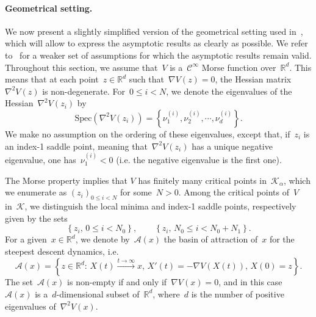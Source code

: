 \documentclass[a4]{article}
\newcommand{\R}{\mathbb{R}}
\newcommand{\1}{\mathbbm 1}
\newcommand{\basin}[1]{\mathcal A(#1)}
\newcommand{\hessEigval}[2]{\nu^{(#1)}_{#2}} %
\begin{document}
    \paragraph{Geometrical setting.}
        We now present a slightly simplified version of the geometrical setting used in~\cite{BLS24}, which will allow to express the asymptotic results as clearly as possible. We refer to~\cite{BLS24} for a weaker set of assumptions for which the asymptotic results remain valid.
        Throughout this section, we assume that~$V$ is a~$\mathcal C^\infty$ Morse function over~$\R^d$. This means that at each point~$z\in \R^d$ such that~$\nabla V(z)=0$, the Hessian matrix~$\nabla^2 V(z)$ is non-degenerate.
        For~$0\leq i < N$, we denote the eigenvalues of the Hessian~$\nabla^2 V(z_i)$ by
        \begin{equation}
            \label{eq:eigvals_hessian}
            \mathrm{Spec}(\nabla^2 V(z_i)) = \left\{\hessEigval{i}{1}, \hessEigval{i}{2}, \dotsm, \hessEigval{i}{d}\right\}.
        \end{equation}
        We make no assumption on the ordering of these eigenvalues, except that, if~$z_i$ is an index-1 saddle point, meaning that~$\nabla^2 V(z_i)$ has a unique negative eigenvalue, one has~$\hessEigval{i}{1}<0$ (i.e. the negative eigenvalue is the first one).
        
        The Morse property implies that $V$ has finitely many critical points in~$\mathcal K_\alpha$, which we enumerate as
        $(z_i)_{0\leq i < N}$ for some~$N>0$.
        Among the critical points of~$V$ in~$\mathcal K$, we distinguish the local minima and index-1 saddle points, respectively given by the sets
        \begin{equation}
            \label{eq:minima_saddles}
            \left\{z_i,\,0\leq i < N_0\right\},\qquad \left\{z_i,\,N_0\leq i<N_0+N_1\right\}.
        \end{equation}
        For a given~$x\in\R^d$, we denote by~$\basin{x}$ the basin of attraction of~$x$ for the steepest descent dynamics, i.e.
        \begin{equation}
            \label{eq:basin}
            \basin{x} = \left\{z\in\R^d:\,X(t)\xrightarrow{t\to\infty} x,\,X'(t)=-\nabla V(X(t)),\,X(0)=z\right\}.
        \end{equation}
        The set~$\basin{x}$ is non-empty if and only if~$\nabla V(x)=0$, and in this case~$\basin{x}$ is a~$d$-dimensional subset of~$\R^d$, where~$d$ is the number of positive eigenvalues of~$\nabla^2 V(x)$.
\end{document}
